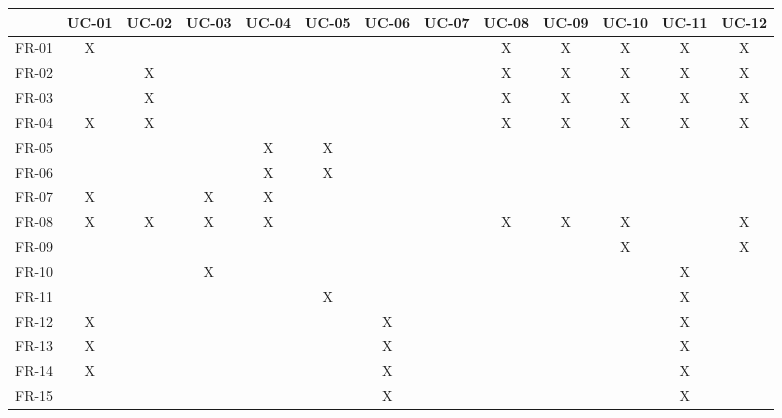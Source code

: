 \begin{table}
\centering
  \begin{tabular}{| c | *{12}{c}|}
    \hline
            & UC-01 & UC-02 & UC-03 & UC-04 & UC-05 & UC-06 & UC-07 & UC-08 & UC-09 & UC-10 & UC-11 & UC-12    \\ \hline
    FR-01   & X     &       &       &       &       &       &       & X     & X     & X     & X     & X        \\ \hline
    FR-02   &       & X     &       &       &       &       &       & X     & X     & X     & X     & X        \\ \hline
    FR-03   &       & X     &       &       &       &       &       & X     & X     & X     & X     & X        \\ \hline
    FR-04   & X     & X     &       &       &       &       &       & X     & X     & X     & X     & X        \\ \hline
    FR-05   &       &       &       & X     & X     &       &       &       &       &       &       &          \\ \hline
    FR-06   &       &       &       & X     & X     &       &       &       &       &       &       &          \\ \hline
    FR-07   & X     &       & X     & X     &       &       &       &       &       &       &       &          \\ \hline
    FR-08   & X     & X     & X     & X     &       &       &       & X     & X     & X     &       & X        \\ \hline
    FR-09   &       &       &       &       &       &       &       &       &       & X     &       & X        \\ \hline
    FR-10   &       &       & X     &       &       &       &       &       &       &       & X     &          \\ \hline
    FR-11   &       &       &       &       & X     &       &       &       &       &       & X     &          \\ \hline
    FR-12   & X     &       &       &       &       & X     &       &       &       &       & X     &          \\ \hline
    FR-13   & X     &       &       &       &       & X     &       &       &       &       & X     &          \\ \hline
    FR-14   & X     &       &       &       &       & X     &       &       &       &       & X     &          \\ \hline
    FR-15   &       &       &       &       &       & X     &       &       &       &       & X     &          \\ \hline

\end{tabular}
\end{table}
